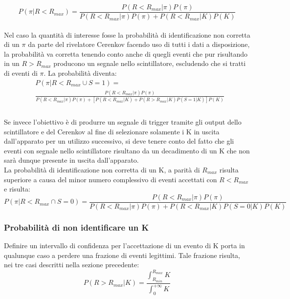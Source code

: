 \documentclass[8pt]{extarticle}
\begin{document}
\begin{equation}
P(\pi | R<R_{max})=\frac{P(R<R_{max}|\pi)P(\pi)}{P(R<R_{max}|\pi)P(\pi)+P(R<R_{max}|K)P(K)}
\end{equation}
\\

Nel caso la quantità di interesse fosse la probabilità di identificazione non corretta di un $\pi$ da parte del rivelatore Cerenkov facendo uso di tutti i dati a disposizione, la probabilità va corretta tenendo conto anche di quegli eventi che pur risultando in un $R>R_{max}$ producono un segnale nello scintillatore, escludendo che si tratti di eventi di $\pi$. La probabilità diventa:
\begin{equation}
\begin{split}
&P(\pi | R<R_{max} \cup S = 1) = \\
&\frac{P(R<R_{max}|\pi)P(\pi)}{P(R<R_{max}|\pi)P(\pi)+\left[P(R<R_{max}|K)+P(R>R_{max}|K)P(S=1|K)\right]P(K)} \\
\end{split}
\end{equation}
\\
Se invece l'obiettivo è di produrre un segnale di trigger tramite gli output dello scintillatore e del Cerenkov al fine di selezionare solamente i K in uscita dall'apparato per un utilizzo successivo, si deve tenere conto del fatto che gli eventi con segnale nello scintillatore risultano da un decadimento di un K che non sarà dunque presente in uscita dall'apparato.\\
La probabilità di identificazione non corretta di un K, a parità di $R_{max}$ risulta superiore a causa del minor numero complessivo di eventi accettati con $R<R_{max}$ e risulta:
\begin{equation}
P(\pi | R<R_{max} \cap S=0 )=\frac{P(R<R_{max}|\pi)P(\pi)}{P(R<R_{max}|\pi)P(\pi)+P(R<R_{max}|K)P(S=0 |K)P(K)} 
\end{equation}

\subsubsection{Probabilità di non identificare un K} \label{subsub:nidK}
Definire un intervallo di confidenza per l'accettazione di un evento di K porta in qualunque caso a perdere una frazione di eventi legittimi. Tale frazione risulta, nei tre casi descritti nella sezione precedente:
\begin{equation}
P(R>R_{max}|K)= \frac{\int_{R_{min}}^{R_{max}} \! K}{\int_{0}^{+\infty} \! K}
\end{equation}
\end{document}
